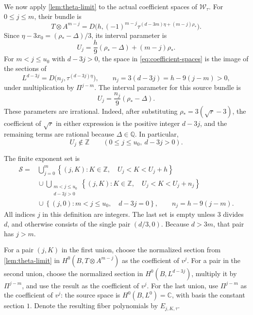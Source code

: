 We now apply \cref{lem:theta-limit} to the actual coefficient spaces of $\mathcal{W}_\tau$. For $0\leq j\leq m$, their bundle is
\[
 T\otimes A^{m-j}
  =D\bigl(h,(-1)^{m-j}
      \tau^{(d-3m)\eta+(m-j)\rho_*}\bigr).
\]
Since $\eta-3x_0=(\rho_*-\Delta)/3$, its interval parameter is
\[
 U_j=\frac h9(\rho_*-\Delta)+(m-j)\rho_*.
\]
For $m<j\leq u_0$ with $d-3j>0$, the space in \eqref{eq:coefficient-spaces} is the image of the sections of
\[
 L^{d-3j}=D\bigl(n_j,\tau^{(d-3j)\eta}\bigr),
 \qquad n_j=3(d-3j)=h-9(j-m)>0,
\]
under multiplication by $\Pi^{j-m}$. The interval parameter for this source bundle is
\[
 U_j=\frac{n_j}{9}(\rho_*-\Delta).
\]
These parameters are irrational. Indeed, after substituting $\rho_*=3(\sqrt r-3)$, the coefficient of $\sqrt r$ in either expression is the positive integer $d-3j$, and the remaining terms are rational because $\Delta\in\mathbb{Q}$. In particular,
\begin{equation}
 U_j\notin\mathbb{Z}\qquad
 (0\leq j\leq u_0,\ d-3j>0).
 \label{eq:nonintegral}
\end{equation}

The finite exponent set is
\begin{equation}
\begin{split}
 \mathcal{S}={}&
  \bigcup_{j=0}^{m}
    \left\{(j,K):K\in\mathbb{Z},\quad
        U_j<K<U_j+h\right\}
 \\
 &{}\cup
  \bigcup_{\substack{m<j\leq u_0\\d-3j>0}}
    \left\{(j,K):K\in\mathbb{Z},\quad
        U_j<K<U_j+n_j\right\}
 \\
 &{}\cup
  \left\{(j,0):m<j\leq u_0,\quad d-3j=0\right\},
 \qquad n_j=h-9(j-m).
\end{split}
\label{eq:exponent-set}
\end{equation}
All indices $j$ in this definition are integers. The last set is empty unless $3$ divides $d$, and otherwise consists of the single pair $(d/3,0)$. Because $d>3m$, that pair has $j>m$.

For a pair $(j,K)$ in the first union, choose the normalized section from \cref{lem:theta-limit} in $H^0(B,T\otimes A^{m-j})$ as the coefficient of $v^j$. For a pair in the second union, choose the normalized section in $H^0(B,L^{d-3j})$, multiply it by $\Pi^{j-m}$, and use the result as the coefficient of $v^j$. For the last union, use $\Pi^{j-m}$ as the coefficient of $v^j$: the source space is $H^0(B,L^0)=\mathbb{C}$, with basis the constant section $1$. Denote the resulting fiber polynomials by $E_{j,K,\tau}$.

